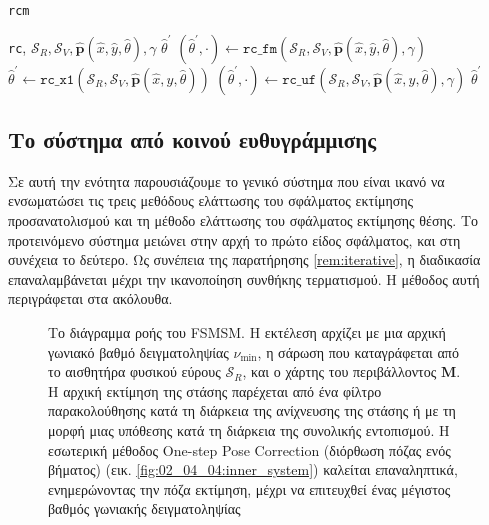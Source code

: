 \begin{algorithm}[!h]
  \caption{\texttt{rcm}}
  \begin{spacing}{1.5}
  \begin{algorithmic}[1]
    \REQUIRE \texttt{rc}, $\mathcal{S}_R, \mathcal{S}_V, \hat{\bm{p}}(\hat{x}, \hat{y}, \hat{\theta}), \gamma$
    \ENSURE $\hat{\theta}^\prime$
      \STATE $(\hat{\theta}^\prime, \cdot) \leftarrow \texttt{rc\_fm}(\mathcal{S}_R, \mathcal{S}_V, \hat{\bm{p}}(\hat{x}, \hat{y}, \hat{\theta}), \gamma)$
      \STATE $\hat{\theta}^\prime \leftarrow \texttt{rc\_x1}(\mathcal{S}_R, \mathcal{S}_V, \hat{\bm{p}}(\hat{x}, \hat{y}, \hat{\theta}))$
      \STATE $(\hat{\theta}^\prime, \cdot) \leftarrow \texttt{rc\_uf}(\mathcal{S}_R, \mathcal{S}_V, \hat{\bm{p}}(\hat{x}, \hat{y}, \hat{\theta}), \gamma)$
    \ENDIF
    \RETURN $\hat{\theta}^\prime$
  \end{algorithmic}
  \end{spacing}
  \label{alg:02_04_04:rc}
\end{algorithm}





\subsection{Το σύστημα από κοινού ευθυγράμμισης}
\label{subsection:02_04_04:02}


Σε αυτή την ενότητα παρουσιάζουμε το γενικό σύστημα που είναι ικανό να
ενσωματώσει τις τρεις μεθόδους ελάττωσης του σφάλματος εκτίμησης
προσανατολισμού και τη μέθοδο ελάττωσης του σφάλματος εκτίμησης θέσης.  Το
προτεινόμενο σύστημα μειώνει στην αρχή το πρώτο είδος σφάλματος, και στη
συνέχεια το δεύτερο. Ως συνέπεια της παρατήρησης \ref{rem:iterative}, η
διαδικασία επαναλαμβάνεται μέχρι την ικανοποίηση συνθήκης τερματισμού. Η
μέθοδος αυτή περιγράφεται στα ακόλουθα.


\begin{figure}[!h]\centering
  
  \caption{\small Το διάγραμμα ροής του FSMSM. Η εκτέλεση αρχίζει με μια αρχική
           γωνιακό βαθμό δειγματοληψίας $\nu_{\min}$, η σάρωση που καταγράφεται
           από το αισθητήρα φυσικού εύρους $\mathcal{S}_R$, και ο χάρτης του
           περιβάλλοντος $\bm{M}$. Η αρχική εκτίμηση της στάσης παρέχεται από
           ένα φίλτρο παρακολούθησης κατά τη διάρκεια της ανίχνευσης της στάσης
           ή με τη μορφή μιας υπόθεσης κατά τη διάρκεια της συνολικής
           εντοπισμού. Η εσωτερική μέθοδος One-step Pose Correction (διόρθωση
           πόζας ενός βήματος) (εικ. \ref{fig:02_04_04:inner_system}) καλείται
           επαναληπτικά, ενημερώνοντας την πόζα εκτίμηση, μέχρι να επιτευχθεί
           ένας μέγιστος βαθμός γωνιακής δειγματοληψίας}
  \label{fig:02_04_04:outer_system}
\end{figure}


